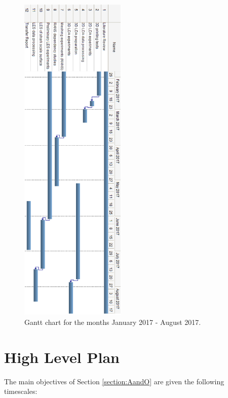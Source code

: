 \documentclass[12pt,oneside,a4paper]{article}
\begin{document}
\begin{figure}[!t]
\centering
\includegraphics[width=0.45\textwidth]{images/ganttChart.png}
\caption{Gantt chart for the months January 2017 - August 2017.}
\label{figure:ganttChart}
\end{figure}

\section{High Level Plan}
The main objectives of Section \ref{section:AandO} are given the following timescales:
\end{document}
